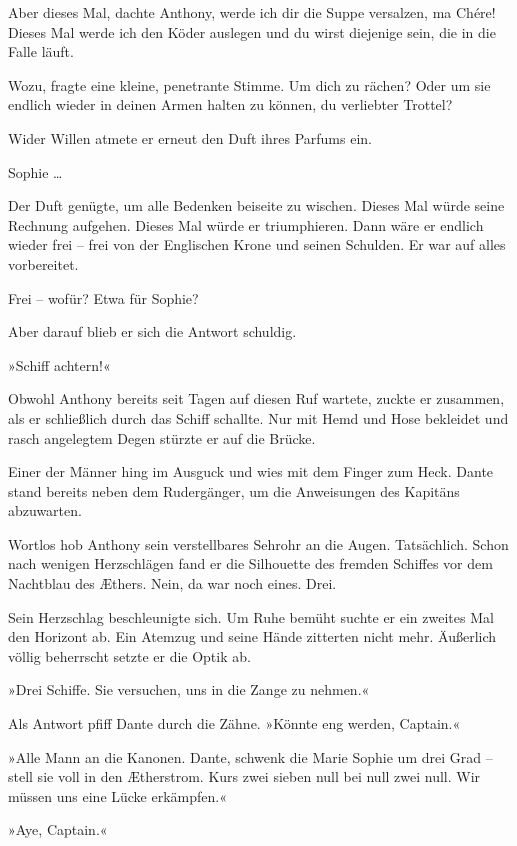 Aber dieses Mal, dachte Anthony, werde ich dir die Suppe versalzen,
ma Chére! Dieses Mal werde ich den Köder auslegen und du wirst
diejenige sein, die in die Falle läuft.

Wozu, fragte eine kleine, penetrante Stimme. Um dich zu rächen?
Oder um sie endlich wieder in deinen Armen halten zu können, du
verliebter Trottel?

Wider Willen atmete er erneut den Duft ihres Parfums ein.

\bigpar

Sophie …

\bigpar

Der Duft genügte, um alle Bedenken beiseite zu wischen. Dieses Mal
würde seine Rechnung aufgehen. Dieses Mal würde er triumphieren.
Dann wäre er endlich wieder frei – frei von der Englischen Krone
und seinen Schulden. Er war auf alles vorbereitet.

Frei – wofür? Etwa für Sophie?

Aber darauf blieb er sich die Antwort schuldig.

\tb

»Schiff achtern!«

Obwohl Anthony bereits seit Tagen auf diesen Ruf wartete, zuckte er
zusammen, als er schließlich durch das Schiff schallte. Nur mit
Hemd und Hose bekleidet und rasch angelegtem Degen stürzte er auf
die Brücke.

Einer der Männer hing im Ausguck und wies mit dem Finger zum Heck.
Dante stand bereits neben dem Rudergänger, um die Anweisungen des
Kapitäns abzuwarten.

Wortlos hob Anthony sein verstellbares Sehrohr an die Augen.
Tatsächlich. Schon nach wenigen Herzschlägen fand er die Silhouette
des fremden Schiffes vor dem Nachtblau des Æthers. Nein, da war
noch eines. Drei.

Sein Herzschlag beschleunigte sich. Um Ruhe bemüht suchte er ein
zweites Mal den Horizont ab. Ein Atemzug und seine Hände zitterten
nicht mehr. Äußerlich völlig beherrscht setzte er die Optik ab.

»Drei Schiffe. Sie versuchen, uns in die Zange zu nehmen.«

Als Antwort pfiff Dante durch die Zähne. »Könnte eng werden,
Captain.«

»Alle Mann an die Kanonen. Dante, schwenk die Marie Sophie um drei
Grad – stell sie voll in den Ætherstrom. Kurs zwei sieben null bei
null zwei null. Wir müssen uns eine Lücke erkämpfen.«

»Aye, Captain.«

